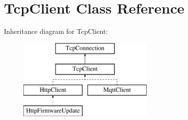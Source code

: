 \hypertarget{class_tcp_client}{}\section{Tcp\+Client Class Reference}
\label{class_tcp_client}
Inheritance diagram for Tcp\+Client\+:\begin{figure}[H]
\begin{center}
\leavevmode
\includegraphics[height=4.000000cm]{class_tcp_client}
\end{center}
\end{figure}
